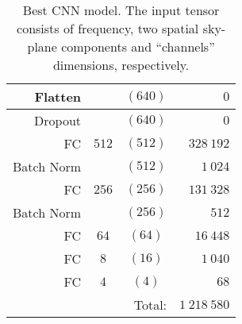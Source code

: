 \documentclass[fleqn,usenatbib]{mnras}
\begin{document}
\begin{table}
\begin{tabular}{r|c|c|r}
\hline
Flatten  &  & $(640)$ &        $0$         \\
\hline
Dropout  &  & $(640)$   &      $0$         \\
\hline
FC & $512$ & $(512)$  &              $328~192$      \\
\hline
Batch Norm & & $(512)$ &               $1~024$       \\
\hline
FC & $256$ & $(256)$  &              $131~328$       \\
\hline
Batch Norm & & $(256)$ &               $512$       \\
\hline
FC & $64$ & $(64)$  &               $16~448$       \\
\hline
FC & $8$ & $(16)$  &               $1~040$       \\
\hline
FC & $4$ & $(4)$   &              $68$        \\
\hline\hline
\multicolumn{3}{r}{Total:} & $1~218~580$ \\
\end{tabular}
\caption{Best CNN model. The input tensor consists of frequency, two spatial sky-plane components and \enquote{channels} dimensions, respectively. }
\label{table:layers_CNN}
\end{table}
\end{document}
